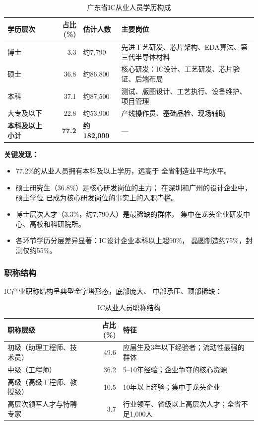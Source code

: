 \documentclass[12pt,a4paper]{article}
\newcommand{\tableHeaderRow}{\rowcolor{tealPrimary}\color{white}}
\newcommand{\tableOddRow}{\rowcolor{mintBG}}
\newcommand{\tableEvenRow}{\rowcolor{white}}
\begin{document}
\begin{table}[H]
\centering
\caption{广东省IC从业人员学历构成}
\label{tab:education}
\begin{tabular}{p{2.6cm}rp{2.5cm}p{7.2cm}}
\toprule
\tableHeaderRow
\textbf{学历层次} & \textbf{占比 (\%)} & \textbf{估计人数} & \textbf{主要岗位} \\
\midrule
\tableOddRow  博士    & 3.3  & 约7,790  & 先进工艺研发、芯片架构、EDA算法、第三代半导体材料 \\
\tableEvenRow 硕士    & 36.8 & 约86,800 & 核心研发：IC设计、工艺研发、芯片验证、后端布局 \\
\tableOddRow  本科    & 37.1 & 约87,500 & 测试、版图设计、工艺执行、设备维护、项目管理 \\
\tableEvenRow 大专及以下 & 22.8 & 约53,900 & 产线操作员、基础品检、现场辅助 \\
\midrule
\tableOddRow  \textbf{本科及以上小计} & \textbf{77.2} & \textbf{约182,000} & --- \\
\bottomrule
\end{tabular}
\end{table}

\textbf{关键发现：}
\begin{itemize}
    \item 77.2\%的从业人员拥有本科及以上学历，远高于
          全省制造业平均水平。
    \item 硕士研究生（36.8\%）是核心研发岗位的主力；
          在深圳和广州的设计企业中，硕士学位
          已成为核心研发岗位的事实上的入职门槛。
    \item 博士层次人才（3.3\%，约7,790人）是最稀缺的群体，
          集中在龙头企业研发中心、高校和科研院所。
    \item 各环节学历分层差异显著：IC设计企业本科以上超90\%，
          晶圆制造约75\%，封测仅约55\%。
\end{itemize}

\subsubsection{职称结构}

IC产业职称结构呈典型金字塔形态，底部庞大、
中部承压、顶部稀缺：

\begin{table}[H]
\centering
\caption{IC从业人员职称结构}
\label{tab:titles}
\begin{tabular}{p{4.5cm}rp{7.5cm}}
\toprule
\tableHeaderRow
\textbf{职称层级} & \textbf{占比 (\%)} & \textbf{特征} \\
\midrule
\tableOddRow  初级（助理工程师、技术员）         & 49.6 & 应届生及3年以下经验者；流动性最强的群体 \\
\tableEvenRow 中级（工程师）                     & 36.2 & 5--10年经验；企业争夺的核心资源 \\
\tableOddRow  高级（高级工程师、教授级）          & 10.5 & 10年以上经验；集中于龙头企业 \\
\tableEvenRow 高层次领军人才与特聘专家            & 3.7 & 行业领军、省级以上高层次人才；全省不足1,000人 \\
\bottomrule
\end{tabular}
\end{table}
\end{document}
